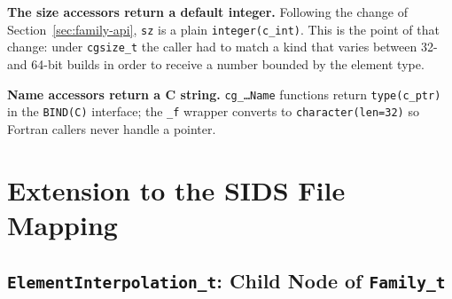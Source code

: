 \documentclass[11pt,letterpaper]{article}
\newif\ifvfourdraft
\newenvironment{v4block}{\ifvfourdraft\color{v4violet}\fi\ignorespaces}{\par}
\begin{document}
\begin{v4block}
\noindent\textbf{The size accessors return a default integer.}  Following the
change of Section~\ref{sec:family-api}, \texttt{sz} is a plain
\texttt{integer(c\_int)}.  This is the point of that change: under
\texttt{cgsize\_t} the caller had to match a kind that varies between 32- and
64-bit builds in order to receive a number bounded by the element type.

\noindent\textbf{Name accessors return a C string.}  \texttt{cg\_\ldots Name}
functions return \texttt{type(c\_ptr)} in the \texttt{BIND(C)} interface; the
\texttt{\_f} wrapper converts to \texttt{character(len=32)} so Fortran callers
never handle a pointer.
\end{v4block}

\newpage

\section{Extension to the SIDS File Mapping}
\label{sec:filemap}

\subsection{\texttt{ElementInterpolation\_t}: Child Node of \texttt{Family\_t}}
\end{document}
